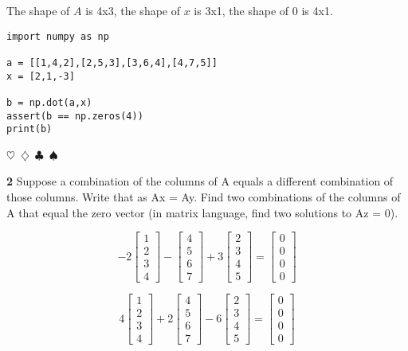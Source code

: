 \documentclass{article}
\newcommand{\sep}{\begin{center}$\heartsuit$~$\diamondsuit$~$\clubsuit$~$\spadesuit$\end{center}}
\begin{document}
The shape of $A$ is 4x3, the shape of $x$ is 3x1, the shape of 0 is 4x1.

\begin{verbatim}
import numpy as np

a = [[1,4,2],[2,5,3],[3,6,4],[4,7,5]]
x = [2,1,-3]

b = np.dot(a,x)
assert(b == np.zeros(4))
print(b)
\end{verbatim}

\sep

\noindent\textbf{2} Suppose a combination of the columns of A equals a different combination of those 
columns. Write that as Ax = Ay. Find two combinations of the columns of A that
equal the zero vector (in matrix language, find two solutions to Az = 0).

\begin{displaymath}
-2 \begin{bmatrix} 1 \\ 2 \\ 3 \\ 4 \end{bmatrix}
- \begin{bmatrix} 4 \\ 5 \\ 6 \\ 7 \end{bmatrix}
+ 3 \begin{bmatrix} 2 \\ 3 \\ 4 \\ 5 \end{bmatrix}
= \begin{bmatrix} 0 \\ 0 \\ 0 \\ 0 \end{bmatrix}
\end{displaymath}

\begin{displaymath}
4 \begin{bmatrix} 1 \\ 2 \\ 3 \\ 4 \end{bmatrix}
+ 2 \begin{bmatrix} 4 \\ 5 \\ 6 \\ 7 \end{bmatrix}
- 6 \begin{bmatrix} 2 \\ 3 \\ 4 \\ 5 \end{bmatrix}
= \begin{bmatrix} 0 \\ 0 \\ 0 \\ 0 \end{bmatrix}
\end{displaymath}
\end{document}

